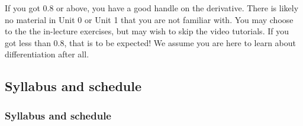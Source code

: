 \documentclass[pdftex, brazil, 12pt, twoside]{article}
\begin{document}
If you got 0.8 or above, you have a good handle on the derivative. There is likely no material
in Unit 0 or Unit 1 that you are not familiar with. You may choose to the the
in-lecture exercises, but may wish to skip the video tutorials. If you got less than 0.8, that is to be expected!
We assume you are here to learn about differentiation after all.


\subsection{Syllabus and schedule}
\label{gs-syllabus}

\subsubsection{Syllabus and schedule}
\label{gs-syllabus-syllabus}

\begin{figure}[H]
  \begin{center}
    \label{fig:syllabus1}
  \end{center}
\end{figure}

\begin{figure}[H]
  \begin{center}
    \label{fig:syllabus2}
  \end{center}
\end{figure}
\end{document}
